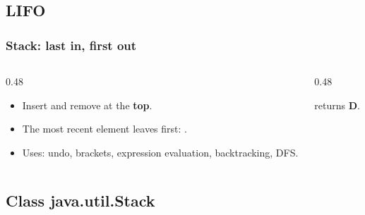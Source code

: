 \documentclass[aspectratio=169,10pt, compress]{beamer}
\begin{document}

\subsection[Concept]{LIFO}




\begin{frame}[t,fragile] \frametitle{Stack: last in, first out}
  \begin{columns}[T]
    \begin{column}{0.48\textwidth}
      \begin{itemize}
        \item Insert and remove at the \textbf{top}.
        \item The most recent element leaves first: .
        \item Uses: undo, brackets, expression evaluation,
              backtracking, DFS.
      \end{itemize}
    \end{column}
    \begin{column}{0.48\textwidth}
      \begin{center}
      \end{center}
      \small {} returns \textbf{D}.
    \end{column}
  \end{columns}
\end{frame}

\subsection[Methods]{Class java.util.Stack}
\end{document}
